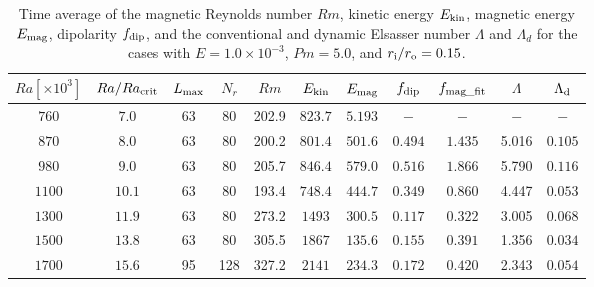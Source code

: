 %
\begin{table}
\caption{Time average of the magnetic Reynolds number $Rm$, kinetic energy $E_{\rm kin}$, magnetic energy $E_{\rm mag}$, dipolarity $f_{\rm dip}$, and {\color{red} the conventional and dynamic Elsasser number $\Lambda$ and $\Lambda_{d}$ for the cases with $E = 1.0 \times 10^{-3}$, $Pm = 5.0$, and} $r_{\rm i}/r_{\rm o} = 0.15$.}
  \begin{tabular}{ccccccccccc}
      \hline
     $Ra[\times 10^3]$  &  $Ra/Ra_{\rm crit}$&
     {\color{red} $L_{\rm max}$} & {\color{red} $N_{r}$} & {\color{red} $Rm$} & $E_{\rm kin}$  &  $E_{\rm mag}$ & $f_{\rm dip}$ & $f_{\rm mag\_fit}$ & $\Lambda$ & $\Lambda_{\rm d}$\\
    \hline
    $760$  & $7.0$ & 63 & 80 &  202.9 & $823.7$ & $5.193$ & $-$ & $-$ & $-$ & $-$ \\
    $870$  & $8.0$ & 63 & 80 &  200.2 & $801.4$ & $501.6$ & $0.494$ & $1.435$ & 5.016 & $0.105$\\
    $980$  & $9.0$ & 63 & 80 &  205.7 & $846.4$ & $579.0$ & $0.516$ & $1.866$ & 5.790 & $0.116$\\
    $1100$  & $10.1$ & 63 & 80 &  193.4 & $748.4$ & $444.7$ & $0.349$ & $0.860$ & 4.447  & $0.053$\\
    $1300$  & $11.9$ & 63 & 80 &  273.2 & $1493$ & $300.5$ & $0.117$ & $0.322$ & 3.005 & $0.068$\\
    $1500$  & $13.8$ & 63 & 80 &  305.5 & $1867$ & $135.6$ & $0.155$ & $0.391$ & 1.356 & $0.034$\\
    $1700$  & $15.6$ & 95 & 128 & 327.2 & $2141$ & $234.3$ & $0.172$ & $0.420$ & 2.343 & $0.054$\\
     \hline
  \end{tabular}
 \label{table:Summary_15}
 \end{table}
 
